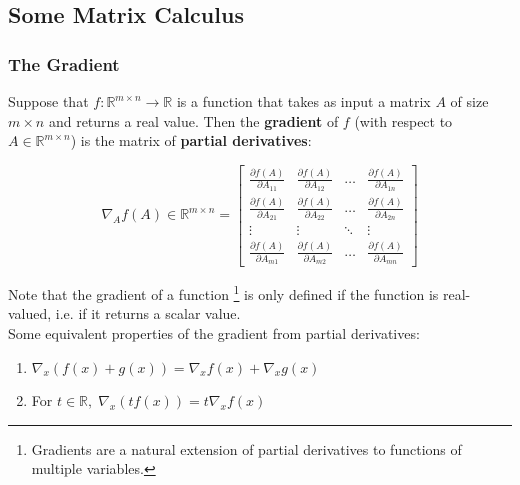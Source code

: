 \documentclass{article}
\begin{document}
\subsection{Some Matrix Calculus}

\subsubsection{The Gradient}

\begin{definition}
    
Suppose that $f: \mathbb{R}^{m\times n}\to \mathbb{R}$ is a function that takes as input a matrix $A$ of size $m\times n$ and returns a real value. Then the \textbf{gradient} of $f$ (with respect to $A\in \mathbb{R}^{m\times n}$) is the matrix of \textbf{partial derivatives}:

\begin{equation}
    \nabla_A f(A) \in \mathbb{R}^{m\times n} = \begin{bmatrix}
        \frac{\partial f(A)}{\partial A_{11}} & \frac{\partial f(A)}{\partial A_{12}} & \dots & \frac{\partial f(A)}{\partial A_{1n}} \\ 
        \frac{\partial f(A)}{\partial A_{21}} & \frac{\partial f(A)}{\partial A_{22}} & \dots & \frac{\partial f(A)}{\partial A_{2n}} \\ 
        \vdots & \vdots & \ddots & \vdots \\ 
        \frac{\partial f(A)}{\partial A_{m1}} & \frac{\partial f(A)}{\partial A_{m2}} &  \dots & \frac{\partial f(A)}{\partial A_{mn}}
    \end{bmatrix}
\end{equation}

\end{definition}

\noindent Note that the gradient of a function \footnote{Gradients are a natural extension of partial derivatives to functions of multiple variables.} is only defined if the function is real-valued, i.e. if it returns a scalar value. \\

\noindent Some equivalent properties of the gradient from partial derivatives:

\begin{enumerate}
    \item $\nabla_x (f(x) + g(x)) = \nabla_x f(x) + \nabla_x g(x)$
    \item For $t \in \mathbb{R}, \; \nabla_x(t f(x)) = t\nabla_x f(x)$
\end{enumerate}
\end{document}
